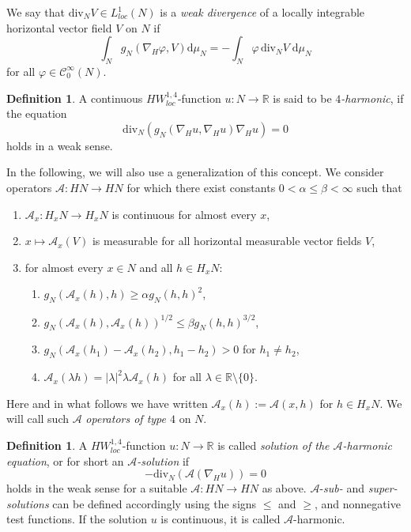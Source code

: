 \documentclass[10pt,letterpaper]{amsart}
\theoremstyle{definition}
\newtheorem{definition}[thm]{Definition}
\numberwithin{thm}{subsection}
\numberwithin{equation}{section}
\begin{document}
We say that $\mathrm{div}_N V \in L_{loc}^1(N)$ is  a \emph{weak
divergence} of a locally integrable horizontal vector field $V$ on
$N$ if
\begin{displaymath}
\int_N g_N(\nabla_H \varphi, V)\mathrm{d}\mu_N = - \int_N \varphi\,
\mathrm{div}_N V \;\mathrm{d}\mu_N
\end{displaymath}
for all $\varphi\in \mathcal{C}_0^{\infty}(N)$.

\begin{definition}\label{d:lap}
A continuous $HW_{loc}^{1,4}$-function $u:N \to \mathbb{R}$
is said to be
\emph{$4$-harmonic}, if the equation
\begin{displaymath}
\mathrm{div}_N\left(g_N(\nabla_H u, \nabla_H u)
\nabla_H u\right)=0
\end{displaymath}
holds in a weak sense.
\end{definition}

In the following, we will also use a generalization of this
concept. We consider operators $\mathcal{A}: HN \to HN$ for which there exist
constants  $0<\alpha \leq \beta <\infty$ such that
\begin{enumerate}
\item $\mathcal{A}_x:H_xN \to H_x N$ is continuous for almost
every $x$, \item $x \mapsto \mathcal{A}_x(V)$ is measurable for
all horizontal measurable vector fields $V$, \item for almost every $x\in
N$ and all $h\in H_xN$:
\begin{enumerate}
\item\label{i:a} $g_N(\mathcal{A}_x(h),h)\geq \alpha g_N(h,h)^{2}$,
\item\label{i:b} $g_N(\mathcal{A}_x(h),\mathcal{A}_x(h))^{1/2}\leq \beta g_N(h,h)^{3/2}$,
\item $g_N(\mathcal{A}_x(h_1)-\mathcal{A}_x(h_2),h_1-h_2)>0$ for $h_1\neq h_2$,
\item $\mathcal{A}_x(\lambda h)=|\lambda|^{2}\lambda \mathcal{A}_x(h)$ for all $\lambda \in \mathbb{R}\setminus \{0\}$.
\end{enumerate}
\end{enumerate}
Here and in what follows we have written ${\mathcal{A}}_x(h) := \mathcal{A}(x,h)$ for $h \in H_xN$.
We will call such $\mathcal A$ {\it operators of type $4$} on $N$.

\begin{definition}\label{d:harmonic_sol}
A $HW_{loc}^{1,4}$-function $u:N \to \mathbb{R}$  is called \emph{solution of the
$\mathcal{A}$-harmonic equation}, or for short an {\it ${\mathcal A}$-solution} if
\begin{equation*}
-\mathrm{div}_N\left(\mathcal{A}( \nabla_H u)\right)=0
\end{equation*}
holds in the weak sense for a
suitable
$\mathcal{A}:HN \to HN$ as above. ${\mathcal A}$-\emph{sub-} and
\emph{super-solutions} can be defined accordingly using the signs
$\leq$ and $\geq$, and nonnegative test functions. If the solution $u$ is continuous, it is called
$\mathcal{A}$-harmonic.
\end{definition}
\end{document}

